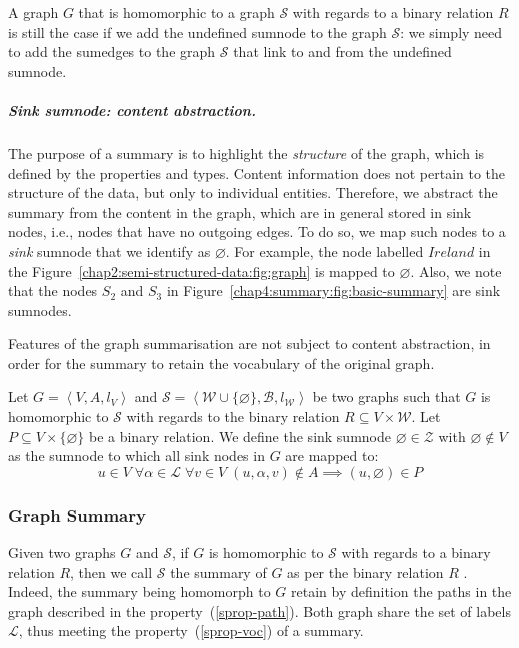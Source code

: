 A graph $G$ that is homomorphic to a graph $\mathcal{S}$ with regards to a binary relation $R$ is still the case if we add the undefined sumnode to the graph $\mathcal{S}$: we simply need to add the sumedges to the graph $\mathcal{S}$ that link to and from the undefined sumnode.

\subparagraph{Sink sumnode: content abstraction.}

The purpose of a summary is to highlight the \emph{structure} of the graph, which is defined by the properties and \gls{types}. Content information does not pertain to the structure of the data, but only to individual entities. Therefore, we abstract the summary from the content in the graph, which are in general stored in sink nodes, i.e., nodes that have no outgoing edges. To do so, we map such nodes to a \emph{sink} sumnode that we identify as $\varnothing$. For example, the node labelled $Ireland$ in the Figure~\ref{chap2:semi-structured-data:fig:graph} is mapped to $\varnothing$. Also, we note that the nodes $S_2$ and $S_3$ in Figure~\ref{chap4:summary:fig:basic-summary} are sink sumnodes.

\begin{remark}
	Features of the graph summarisation are not subject to content abstraction, in order for the summary to retain the vocabulary of the original graph.
\end{remark}

\begin{definition}
Let $G=\left\langle V, A, l_V \right\rangle$ and $\mathcal{S}=\left\langle \mathcal{W} \cup \{ \varnothing \}, \mathcal{B}, l_\mathcal{W} \right\rangle$ be two graphs such that $G$ is homomorphic to $\mathcal{S}$ with regards to the binary relation $R \subseteq V \times \mathcal{W}$.
Let $P \subseteq V \times \{ \varnothing \}$ be a binary relation.
We define the sink sumnode $\varnothing \in \mathcal{Z}$ with $\varnothing \not \in V$ as the sumnode to which all sink nodes in $G$ are mapped to:
$$
u \in V\; \forall \alpha \in \mathcal{L}\; \forall v \in V\; (u, \alpha, v) \not \in A \implies (u, \varnothing) \in P
$$
\label{def:sink-sumnode}
\end{definition}

\subsubsection{Graph Summary}

Given two graphs $G$ and $\mathcal{S}$, if $G$ is homomorphic to $\mathcal{S}$ with regards to a binary relation $R$, then we call $\mathcal{S}$ the summary of $G$ as per the binary relation $R$ \cite{campinas:2012:dexa}. Indeed, the summary being homomorph to $G$ retain by definition the paths in the graph described in the property~(\ref{sprop-path}). Both graph share the set of labels $\mathcal{L}$, thus meeting the property~(\ref{sprop-voc}) of a summary.

